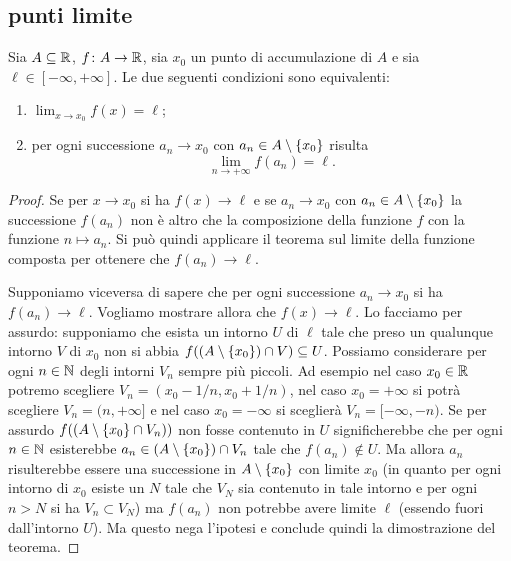 \subsection{punti limite}

\begin{theorem}%
\label{th:ponte}%
\mymark{***}%
Sia $A \subseteq {\mathbb R}$, $f\colon A \to {\mathbb R}$, sia $x_0$ un punto di accumulazione di $A$ e sia
$\ell \in [-\infty, +\infty]$.
Le due seguenti condizioni sono equivalenti:
\begin{enumerate}
\item $\displaystyle \lim_{x\to x_0} f(x) = \ell$;
\item per ogni successione $a_n\to x_0$ con $a_n\in A\setminus{\left\{ x_0 \right\}}$ risulta
\[
\lim_{n\to+\infty} f(a_n) = \ell. 
\]
\end{enumerate}
\end{theorem}
%
\begin{proof}
\mymark{***}
Se per $x\to x_0$ si ha $f(x)\to \ell$ e se $a_n \to x_0$ con $a_n\in A\setminus{\left\{ x_0 \right\}}$ la successione $f(a_n)$ non è altro che la composizione
della funzione $f$ con la funzione $n\mapsto a_n$. Si può quindi applicare
il teorema sul limite della funzione composta per ottenere che $f(a_n)\to \ell$.

Supponiamo viceversa di sapere che per ogni successione $a_n\to x_0$ si ha $f(a_n)\to \ell$. Vogliamo mostrare allora che $f(x)\to \ell$. Lo facciamo per assurdo: supponiamo che esista un intorno $U$ di $\ell$ tale che preso un qualunque intorno $V$ di $x_0$ non si abbia $f((A\setminus{\left\{ x_0 \right\}})\cap V)\subseteq U$.
Possiamo considerare per ogni $n\in {\mathbb N}$ degli intorni $V_n$ sempre più piccoli. Ad esempio nel caso $x_0 \in {\mathbb R}$ potremo scegliere $V_n = (x_0-1/n, x_0+1/n)$, nel caso $x_0 = +\infty$ si potrà scegliere $V_n = (n,+\infty]$ e nel caso $x_0=-\infty$ si sceglierà $V_n = [-\infty, -n)$.
Se per assurdo $f((A\setminus{\left\{ x_0 \right\}}\cap V_n))$ non fosse contenuto in $U$
significherebbe che per ogni $n\in{\mathbb N}$ esisterebbe $a_n \in (A\setminus{\left\{ x_0 \right\}})\cap V_n$ tale che $f(a_n)\not \in U$. Ma allora $a_n$ risulterebbe essere una successione in
$A\setminus {\left\{ x_0 \right\}}$ con limite $x_0$
(in quanto per ogni intorno di $x_0$ esiste un $N$ tale che $V_N$ sia contenuto in tale intorno e per ogni $n>N$ si ha $V_n\subset V_N$)
ma $f(a_n)$ non potrebbe avere limite $\ell$
(essendo fuori dall'intorno $U$).
Ma questo nega l'ipotesi e conclude quindi la dimostrazione del teorema.
\end{proof}
